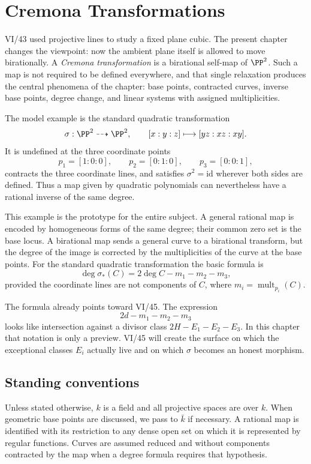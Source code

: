 \chapter{Cremona Transformations}
\label{ch:vi44-cremona-transformations}
\providecommand{\Cr}{\operatorname{Cr}}
\providecommand{\Bir}{\operatorname{Bir}}
\providecommand{\Bs}{\operatorname{Bs}}
\providecommand{\mult}{\operatorname{mult}}

VI/43 used projective lines to study a fixed plane cubic.  The present chapter changes the viewpoint: now the ambient plane itself is allowed to move birationally.  A \emph{Cremona transformation} is a birational self-map of \(\PP^2\).  Such a map is not required to be defined everywhere, and that single relaxation produces the central phenomena of the chapter: base points, contracted curves, inverse base points, degree change, and linear systems with assigned multiplicities.

The model example is the standard quadratic transformation
\[
  \sigma:\PP^2\dashrightarrow\PP^2,
  \qquad
  [x:y:z]\longmapsto[yz:xz:xy].
\]
It is undefined at the three coordinate points
\[
  p_1=[1:0:0],\qquad p_2=[0:1:0],\qquad p_3=[0:0:1],
\]
contracts the three coordinate lines, and satisfies \(\sigma^2=\mathrm{id}\) wherever both sides are defined.  Thus a map given by quadratic polynomials can nevertheless have a rational inverse of the same degree.

This example is the prototype for the entire subject.  A general rational map is encoded by homogeneous forms of the same degree; their common zero set is the base locus.  A birational map sends a general curve to a birational transform, but the degree of the image is corrected by the multiplicities of the curve at the base points.  For the standard quadratic transformation the basic formula is
\[
  \boxed{\deg \sigma_*(C)=2\deg C-m_1-m_2-m_3,}
\]
provided the coordinate lines are not components of \(C\), where \(m_i=\mult_{p_i}(C)\).

The formula already points toward VI/45.  The expression
\[
  2d-m_1-m_2-m_3
\]
looks like intersection against a divisor class \(2H-E_1-E_2-E_3\).  In this chapter that notation is only a preview.  VI/45 will create the surface on which the exceptional classes \(E_i\) actually live and on which \(\sigma\) becomes an honest morphism.

\section*{Standing conventions}
Unless stated otherwise, \(k\) is a field and all projective spaces are over \(k\).  When geometric base points are discussed, we pass to \(\bar k\) if necessary.  A rational map is identified with its restriction to any dense open set on which it is represented by regular functions.  Curves are assumed reduced and without components contracted by the map when a degree formula requires that hypothesis.

